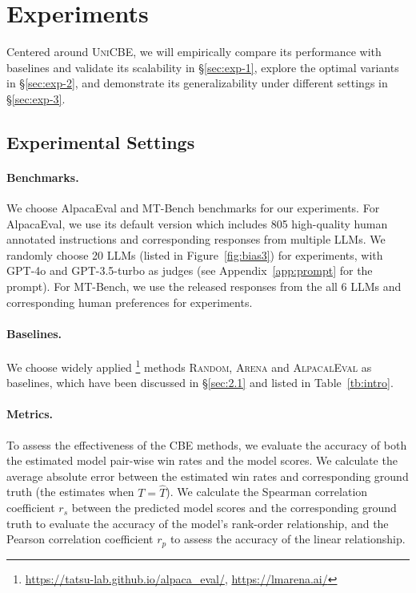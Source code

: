 \section{Experiments}
Centered around \textsc{UniCBE}, we will empirically compare its performance with baselines and validate its scalability in \S\ref{sec:exp-1}, explore the optimal variants in \S\ref{sec:exp-2}, and demonstrate its generalizability under different settings in \S\ref{sec:exp-3}.

\subsection{Experimental Settings}
\paragraph{Benchmarks.} We choose AlpacaEval \citep{alpacaeval} and MT-Bench \citep{judging} benchmarks for our experiments. For AlpacaEval, we use its default version which includes 805 high-quality human annotated instructions and corresponding responses from multiple LLMs. We randomly choose 20 LLMs (listed in Figure~\ref{fig:bias3}) for experiments, with GPT-4o and GPT-3.5-turbo as judges (see Appendix~\ref{app:prompt} for the prompt). For MT-Bench, we use the released responses from the all 6 LLMs and corresponding human preferences for experiments.
\paragraph{Baselines.} We choose widely applied \footnote{\url{https://tatsu-lab.github.io/alpaca_eval/}, \url{https://lmarena.ai/}} methods \textsc{Random}, \textsc{Arena} and \textsc{AlpacalEval} as baselines, which have been discussed in \S\ref{sec:2.1} and listed in Table~\ref{tb:intro}.
\paragraph{Metrics.} 
To assess the effectiveness of the CBE methods, we evaluate the accuracy of both the estimated model pair-wise win rates and the model scores. We calculate the average absolute error between the estimated win rates and corresponding ground truth (the estimates when $T = \hat{T}$).
We calculate the Spearman correlation coefficient $r_s$ between the predicted model scores and the corresponding ground truth to evaluate the accuracy of the model's rank-order relationship, and the Pearson correlation coefficient $r_p$ to assess the accuracy of the linear relationship.
